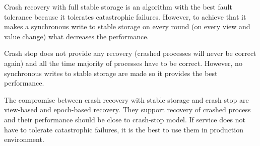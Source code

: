 Crash recovery with full stable storage is an algorithm with the best fault tolerance because it tolerates catastrophic failures. However, to achieve that it makes a synchronous write to stable storage on every round (on every view and value change) what decreases the performance.

Crash stop does not provide any recovery (crashed processes will never be correct again) and all the time majority of processes have to be correct. However, no synchronous writes to stable storage are made so it provides the best performance.

The compromise between crash recovery with stable storage and crash stop are view-based and epoch-based recovery. They support recovery of crashed process and their performance should be close to crash-stop model. If service does not have to tolerate catastrophic failures, it is the best to use them in production environment.
